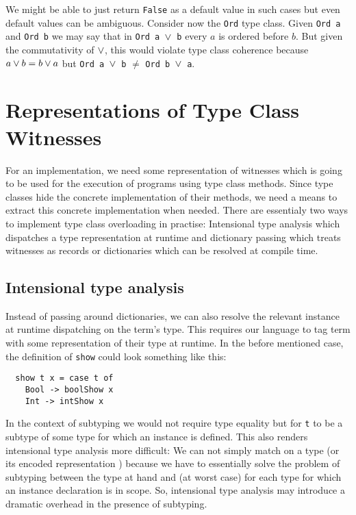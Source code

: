 We might be able to just return \texttt{False} as a default value in such cases but even default values can be ambiguous.
Consider now the \texttt{Ord} type class. Given \texttt{Ord a} and \texttt{Ord b} we may say that in \texttt{Ord a $\vee$ b} every $a$ is ordered before $b$.
But given the commutativity of $\vee$, this would violate type class coherence because $a \vee b = b \vee a$ but \texttt{Ord a $\vee$ b} $\neq$ \texttt{Ord b $\vee$ a}.


\section{Representations of Type Class Witnesses}
\label{sec:representations}

For an implementation, we need some representation of witnesses which is going to be used for the execution of programs using type class methods.
Since type classes hide the concrete implementation of their methods, we need a means to extract this concrete implementation when needed.
There are essentialy two ways to implement type class overloading in practise: Intensional type analysis which dispatches a type representation at runtime and dictionary passing which treats witnesses as records or dictionaries which can be resolved at compile time.

\subsection{Intensional type analysis}
\label{sec:intensional-analysis}

Instead of passing around dictionaries, we can also resolve the relevant instance at runtime dispatching on the term's type.
This requires our language to tag term with some representation of their type at runtime.
In the before mentioned case, the definition of \texttt{show} could look something like this:

\begin{verbatim}
  show t x = case t of
    Bool -> boolShow x
    Int -> intShow x
\end{verbatim}

In the context of subtyping we would not require type equality but for \texttt{t} to be a subtype of some type for which an instance is defined.
This also renders intensional type analysis more difficult:
We can not simply match on a type (or its encoded representation \cite{weirich2000}) because we have to essentially solve the problem of subtyping between the type at hand and (at worst case) for each type for which an instance declaration is in scope.
So, intensional type analysis may introduce a dramatic overhead in the presence of subtyping.

